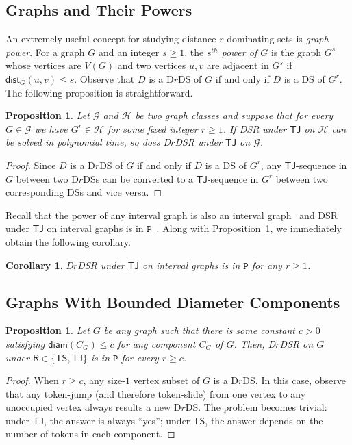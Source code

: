 \documentclass[a4paper]{article}
\theoremstyle{plain}
\newtheorem{corollary}[theorem]{Corollary}
\newtheorem{proposition}[theorem]{Proposition}
\theoremstyle{definition}
\newcommand{\sfTS}{{\mathsf{TS}}} %
\newcommand{\sfTJ}{{\mathsf{TJ}}} %
\newcommand{\sfR}{{\mathsf{R}}} %
\newcommand{\calG}{{\mathcal{G}}}
\newcommand{\calH}{{\mathcal{H}}}
\newcommand{\ttP}{{\mathtt{P}}}
\newcommand{\dist}{\mathsf{dist}} %
\newcommand{\diam}{\mathsf{diam}} %
\begin{document}
\subsection{Graphs and Their Powers}
\label{sec:power-graph}

An extremely useful concept for studying distance-$r$ dominating sets is \textit{graph power}.
For a graph $G$ and an integer $s \geq 1$, the \textit{$s^{th}$ power of $G$} is the graph $G^s$ whose vertices are $V(G)$ and two vertices $u, v$ are adjacent in $G^s$ if $\dist_G(u, v) \leq s$. 
Observe that $D$ is a D$r$DS of $G$ if and only if $D$ is a DS of $G^{r}$.
The following proposition is straightforward.
\begin{proposition}\label{prop:power-graph}
	Let $\calG$ and $\calH$ be two graph classes and suppose that for every $G \in \calG$ we have $G^r \in \calH$ for some fixed integer $r \geq 1$.
	If \textsc{DSR} under $\sfTJ$ on $\calH$ can be solved in polynomial time, so does \textsc{D$r$DSR} under $\sfTJ$ on $\calG$. %
\end{proposition}
\begin{proof}
	Since $D$ is a D$r$DS of $G$ if and only if $D$ is a DS of $G^{r}$, any $\sfTJ$-sequence in $G$ between two D$r$DSs can be converted to a $\sfTJ$-sequence in $G^r$ between two corresponding DSs and vice versa.
\end{proof}

Recall that the power of any interval graph is also an interval graph~\cite{AgnarssonGH00,ChenC10} and 
\textsc{DSR} under $\sfTJ$ on interval graphs is in $\ttP$~\cite{HaddadanIMNOST16}.
Along with Proposition~\ref{prop:power-graph}, we immediately obtain the following corollary.
\begin{corollary}\label{cor:TJ-interval}
	\textsc{D$r$DSR} under $\sfTJ$ on interval graphs is in $\ttP$ for any $r \geq 1$.
\end{corollary}

\subsection{Graphs With Bounded Diameter Components}
\label{sec:bounded-diam}

\begin{proposition}\label{prop:bounded-diameter}
	Let $G$ be any graph such that there is some constant $c > 0$ satisfying $\diam(C_G) \leq c$ for any component $C_G$ of $G$.
	Then, \textsc{D$r$DSR} on $G$ under $\sfR \in \{\sfTS, \sfTJ\}$ is in $\ttP$ for every $r \geq c$.
\end{proposition}
\begin{proof}
	When $r \geq c$, any size-$1$ vertex subset of $G$ is a D$r$DS.
	In this case, observe that any token-jump (and therefore token-slide) from one vertex to any unoccupied vertex always results a new D$r$DS. 
	The problem becomes trivial: under $\sfTJ$, the answer is always ``yes''; under $\sfTS$, the answer depends on the number of tokens in each component.
\end{proof}
\end{document}
